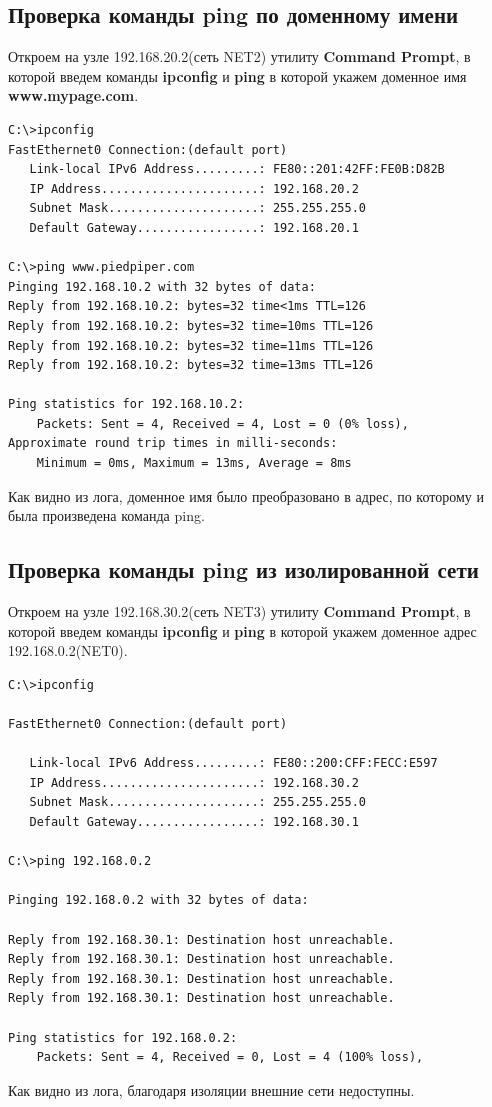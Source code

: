 \subsection{Проверка команды ping по доменному имени}
Откроем на узле 192.168.20.2(сеть NET2) утилиту \textbf{Command Prompt}, в которой введем команды \textbf{ipconfig} и \textbf{ping} в которой укажем доменное имя \textbf{www.mypage.com}.
\begin{lstlisting}[language={}]
C:\>ipconfig
FastEthernet0 Connection:(default port)
   Link-local IPv6 Address.........: FE80::201:42FF:FE0B:D82B
   IP Address......................: 192.168.20.2
   Subnet Mask.....................: 255.255.255.0
   Default Gateway.................: 192.168.20.1

C:\>ping www.piedpiper.com
Pinging 192.168.10.2 with 32 bytes of data:
Reply from 192.168.10.2: bytes=32 time<1ms TTL=126
Reply from 192.168.10.2: bytes=32 time=10ms TTL=126
Reply from 192.168.10.2: bytes=32 time=11ms TTL=126
Reply from 192.168.10.2: bytes=32 time=13ms TTL=126

Ping statistics for 192.168.10.2:
    Packets: Sent = 4, Received = 4, Lost = 0 (0% loss),
Approximate round trip times in milli-seconds:
    Minimum = 0ms, Maximum = 13ms, Average = 8ms
\end{lstlisting}
Как видно из лога, доменное имя было преобразовано в адрес, по которому и была произведена команда ping.

\subsection{Проверка команды ping из изолированной сети}
Откроем на узле 192.168.30.2(сеть NET3) утилиту \textbf{Command Prompt}, в которой введем команды \textbf{ipconfig} и \textbf{ping} в которой укажем доменное адрес 192.168.0.2(NET0).
\begin{lstlisting}[language={}]
C:\>ipconfig

FastEthernet0 Connection:(default port)

   Link-local IPv6 Address.........: FE80::200:CFF:FECC:E597
   IP Address......................: 192.168.30.2
   Subnet Mask.....................: 255.255.255.0
   Default Gateway.................: 192.168.30.1

C:\>ping 192.168.0.2

Pinging 192.168.0.2 with 32 bytes of data:

Reply from 192.168.30.1: Destination host unreachable.
Reply from 192.168.30.1: Destination host unreachable.
Reply from 192.168.30.1: Destination host unreachable.
Reply from 192.168.30.1: Destination host unreachable.

Ping statistics for 192.168.0.2:
    Packets: Sent = 4, Received = 0, Lost = 4 (100% loss),
\end{lstlisting}
Как видно из лога, благодаря изоляции внешние сети недоступны.
\clearpage
